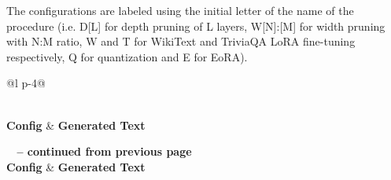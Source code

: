 The configurations are labeled using the initial letter of the name of the procedure (i.e. D[L] for depth pruning of L layers, W[N]:[M] for width pruning with N:M ratio, W and T for WikiText and TriviaQA LoRA fine-tuning respectively, Q for quantization and E for EoRA).

{\scriptsize
\begin{longtable}{@{}l p{\dimexpr\textwidth-3cm-4\tabcolsep}@{}}
\caption[Text Generation Examples]{Sample answers generated by selected model configurations} \label{tab:generated_answers} \\
\hline
\textbf{Config} & \textbf{Generated Text} \\
\hline
\endfirsthead

%
{{\footnotesize \bfseries \tablename\ \thetable{} -- continued from previous page}} \\
\hline
\textbf{Config} & \textbf{Generated Text} \\
\hline
\endhead

\hline {} \\
\endfoot


\end{longtable}}
